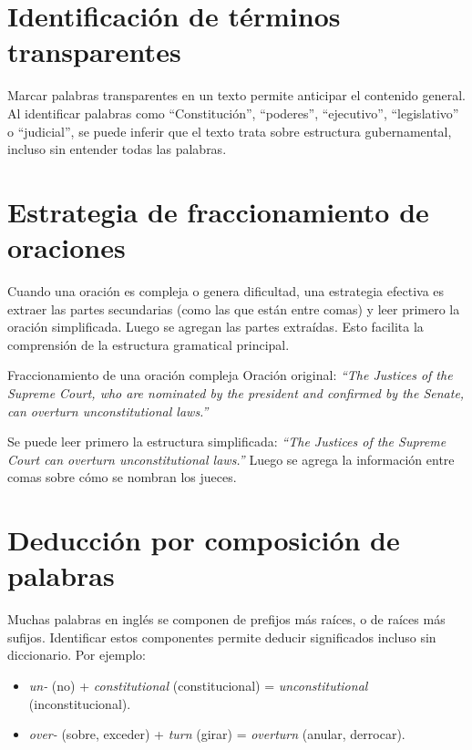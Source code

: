 \documentclass[12pt,oneside]{book}
\begin{document}
\section{Identificación de términos transparentes}

Marcar palabras transparentes en un texto permite anticipar el contenido general. Al identificar palabras como ``Constitución'', ``poderes'', ``ejecutivo'', ``legislativo'' o ``judicial'', se puede inferir que el texto trata sobre estructura gubernamental, incluso sin entender todas las palabras.

\section{Estrategia de fraccionamiento de oraciones}

Cuando una oración es compleja o genera dificultad, una estrategia efectiva es extraer las partes secundarias (como las que están entre comas) y leer primero la oración simplificada. Luego se agregan las partes extraídas. Esto facilita la comprensión de la estructura gramatical principal.

\begin{example}{Fraccionamiento de una oración compleja}
Oración original: \textit{``The Justices of the Supreme Court, who are nominated by the president and confirmed by the Senate, can overturn unconstitutional laws.''}

Se puede leer primero la estructura simplificada: \textit{``The Justices of the Supreme Court can overturn unconstitutional laws.''} Luego se agrega la información entre comas sobre cómo se nombran los jueces.
\end{example}

\section{Deducción por composición de palabras}

Muchas palabras en inglés se componen de prefijos más raíces, o de raíces más sufijos. Identificar estos componentes permite deducir significados incluso sin diccionario. Por ejemplo:

\begin{itemize}
    \item \textit{un-} (no) + \textit{constitutional} (constitucional) = \textit{unconstitutional} (inconstitucional).
    \item \textit{over-} (sobre, exceder) + \textit{turn} (girar) = \textit{overturn} (anular, derrocar).
\end{itemize}
\end{document}
